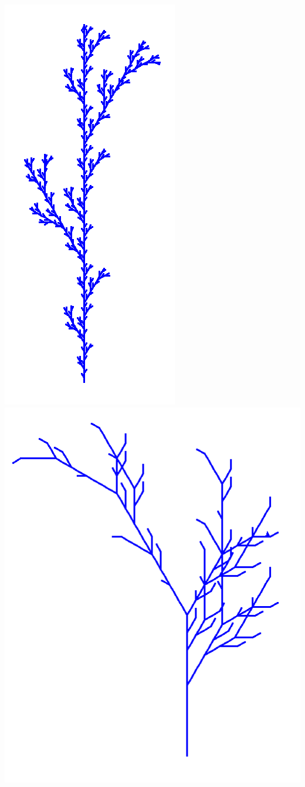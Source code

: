\documentclass[11pt,class=report,crop=false]{standalone}
\begin{document}
\begin{activite}
\begin{enumerate}
\begin{center}
\includegraphics[scale=\myscale,scale=0.25]{screen-lsystems-16}\qquad
\includegraphics[scale=\myscale,scale=0.25]{screen-lsystems-12}

\end{center}
\end{enumerate}
\end{activite}
\end{document}
